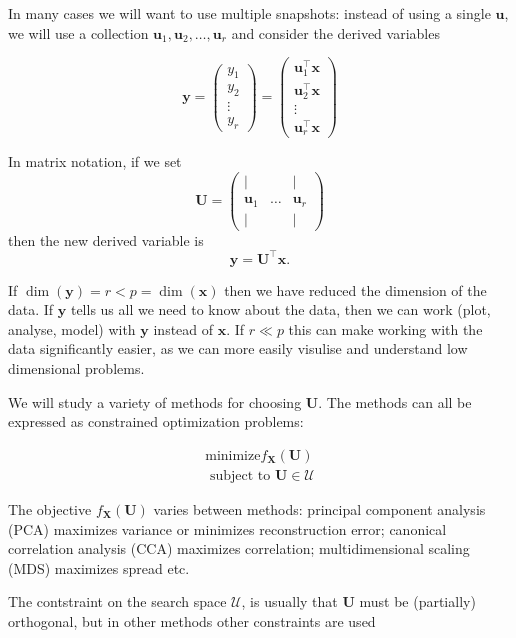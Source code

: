 \documentclass[]{book}
\theoremstyle{definition}
\theoremstyle{definition}
\theoremstyle{definition}
\theoremstyle{remark}
\begin{document}
In many cases we will want to use multiple snapshots: instead of using a single \(\mathbf u\), we will use a collection \(\mathbf u_1, \mathbf u_2, \ldots, \mathbf u_r\) and consider the derived variables

\[\mathbf y= \begin{pmatrix} y_1\\y_2 \\ \vdots \\ y_r\end{pmatrix} = \begin{pmatrix}
\mathbf u_1^\top \mathbf x\\  \mathbf u_2^\top \mathbf x\\\vdots\\  \mathbf u_r^\top \mathbf x\end{pmatrix}\]

In matrix notation, if we set
\[\mathbf U= \begin{pmatrix} 
|&&|\\
\mathbf u_1 & \ldots & \mathbf u_r\\
|&&|\end{pmatrix}\]
then the new derived variable is
\[\mathbf y= \mathbf U^\top \mathbf x.\]

If \(\dim(\mathbf y)=r<p=\dim(\mathbf x)\) then we have reduced the dimension of the data. If \(\mathbf y\) tells us all we need to know about the data, then we can work (plot, analyse, model) with \(\mathbf y\) instead of \(\mathbf x\). If \(r\ll p\) this can make working with the data significantly easier, as we can more easily visulise and understand low dimensional problems.

We will study a variety of methods for choosing \(\mathbf U\). The methods can all be expressed as constrained optimization problems:

\begin{align}
\mbox{minimize} f_{\mathbf X}(\mathbf U) \label{eq:dimredopt} \\
\mbox{ subject to } \mathbf U\in \mathcal{U} 
\end{align}

The objective \(f_{\mathbf X}(\mathbf U)\) varies between methods: principal component analysis (PCA) maximizes variance or minimizes reconstruction error; canonical correlation analysis (CCA) maximizes correlation; multidimensional scaling (MDS) maximizes spread etc.

The contstraint on the search space \(\mathcal{U}\), is usually that \(\mathbf U\) must be (partially) orthogonal, but in other methods other constraints are used
\end{document}
